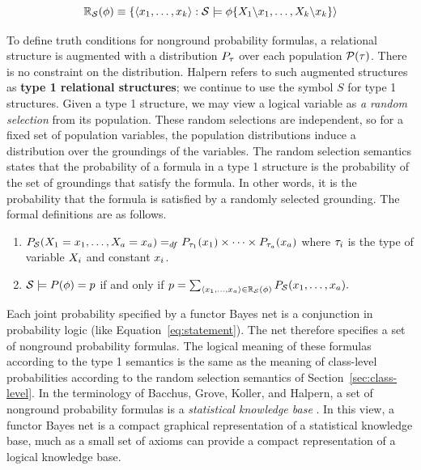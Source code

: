 \documentclass[oribibl]{llncs}
\begin{document}
\[
\mathbb{R}_{\mathcal{S}}(\phi) \equiv \{\langle x_{1}, \ldots, x_{k} \rangle: \mathcal{S} \models \phi \{X_{1}\backslash x_{1},\ldots,X_{k} \backslash x_{k}\}  \rangle 
\]

To define truth conditions for nonground probability formulas, a relational structure is augmented with a distribution $P_{\tau}$ over each population $\mathcal{P}(\tau)$.  There is no constraint on the distribution. Halpern refers to such augmented structures as \textbf{type 1 relational structures}; we continue to use the symbol $S$ for type 1 structures.
Given a type 1 structure, we may view a logical variable as {\em a random selection} from its population. These random selections are independent, so for a fixed set of population variables, the population distributions induce a distribution over the groundings of the variables. The random selection semantics states that the probability of a formula in a type 1 structure is the probability of the set of groundings that satisfy the formula. In other words, it is the probability that the formula is satisfied by a randomly selected grounding. The formal definitions are as follows. 


\begin{enumerate}
\item $P_{\mathcal{S}}(X_{1} = x_{1},\ldots,X_{a} = x_{a}) =_{df} P_{\tau_{1}}(x_{1}) \times \cdots \times P_{\tau_{a}}(x_{a})$
where $\tau_{i}$ is the type of variable $X_{i}$ and constant $x_{i}$.
\item $\mathcal{S} \models P(\phi) = p$ if and only if $p = \sum_{\langle x_{1},\ldots,x_{a} \rangle \in \mathbb{R}_{\mathcal{S}}(\phi)} P_{\mathcal{S}} (x_{1},\ldots,x_{a}). $
\end{enumerate}

Each joint probability specified by a functor Bayes net is a conjunction in probability logic (like Equation~\ref{eq:statement}). The net therefore specifies a set of nonground probability formulas. The logical meaning of these formulas according to the type 1 semantics is the same as the meaning of class-level probabilities according to the random selection semantics of Section~\ref{sec:class-level}. In the terminology of Bacchus, Grove, Koller, and Halpern, a set of nonground probability formulas is a {\em statistical knowledge base} \cite{Bacchus1992}. In this view, a functor Bayes net is a compact graphical representation of a statistical knowledge base, much as a small set of axioms can provide a compact representation of a logical knowledge base.
\end{document}
